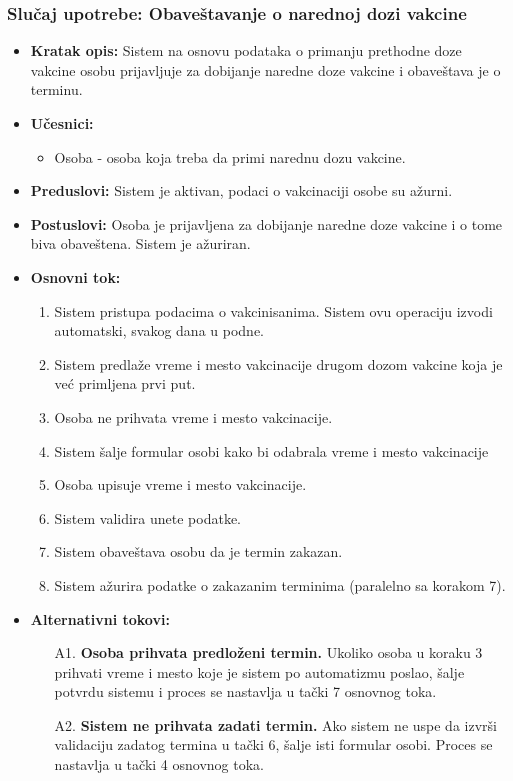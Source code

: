 \documentclass[titlepage]{article}
\begin{document}
\subsubsection{Slučaj upotrebe: Obaveštavanje o narednoj dozi vakcine}
\begin{itemize}
    \item \textbf{Kratak opis:} Sistem na osnovu podataka o primanju prethodne doze vakcine osobu prijavljuje za dobijanje naredne doze vakcine i obaveštava je o terminu.
    \item \textbf{Učesnici:} 
        \begin{itemize}
            \item Osoba - osoba koja treba da primi narednu dozu vakcine.
        \end{itemize}
    \item \textbf{Preduslovi:} Sistem je aktivan, podaci o vakcinaciji osobe su ažurni.
    \item \textbf{Postuslovi:} Osoba je prijavljena za dobijanje naredne doze vakcine i o tome biva obaveštena. Sistem je ažuriran.
    \item \textbf{Osnovni tok:}
    \begin{enumerate}
        \item Sistem pristupa podacima o vakcinisanima. Sistem ovu operaciju izvodi automatski, svakog dana u podne.
        \item Sistem predla\v{z}e vreme i mesto vakcinacije drugom dozom vakcine koja je već primljena prvi put.
        \item Osoba ne prihvata vreme i mesto vakcinacije.
        \item Sistem šalje formular osobi kako bi odabrala vreme i mesto vakcinacije
        \item Osoba upisuje vreme i mesto vakcinacije.
        \item Sistem validira unete podatke.
        \item Sistem obave\v{s}tava osobu da je termin zakazan.
        \item Sistem a\v{z}urira podatke o zakazanim terminima (paralelno sa korakom 7).
    \end{enumerate}
    \item \textbf{Alternativni tokovi:}
    \begin{itemize}
        \item[A1.] \textbf{Osoba prihvata predlo\v{z}eni termin.} Ukoliko osoba u koraku 3 prihvati vreme i mesto koje je sistem po automatizmu poslao, šalje potvrdu sistemu i proces se nastavlja u tački 7 osnovnog toka. 
        \item[A2.] \textbf{Sistem ne prihvata zadati termin.} Ako sistem ne uspe da izvrši validaciju zadatog termina u tački 6, \v{s}alje isti formular osobi. 
        Proces se nastavlja u tački 4 osnovnog toka.
        

\end{itemize}
\end{itemize}
\end{document}
